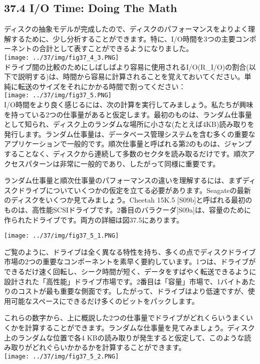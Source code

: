 \hypertarget{io-time-doing-the-math}{%
\subsection*{37.4 I/O Time: Doing The
Math}\label{io-time-doing-the-math}}

ディスクの抽象モデルが完成したので、ディスクのパフォーマンスをよりよく理解するために、少し分析することができます。特に、I/O時間を3つの主要コンポーネントの合計として表すことができるようになりました。\\
\texttt{[image: ../37/img/fig37\_4\_3.PNG]}\\
ドライブ間の比較のためにしばしばより容易に使用されるI/O(R\_I/O)の割合(以下で説明する)は、時間から容易に計算されることを覚えておいてください。単純に転送のサイズをそれにかかる時間で割ってください：\\
\texttt{[image: ../37/img/fig37\_5.PNG]}\\
I/O時間をより良く感じるには、次の計算を実行してみましょう。私たちが興味を持っている2つの仕事量があると仮定します。最初のものは、ランダム仕事量として知られ、ディスク上のランダムな場所に小さな(たとえば4KB)読み取りを発行します。ランダム仕事量は、データベース管理システムを含む多くの重要なアプリケーションで一般的です。順次仕事量と呼ばれる第2のものは、ジャンプすることなく、ディスクから連続して多数のセクタを読み取るだけです。順次アクセスパターンは非常に一般的であり、したがって同様に重要です。

ランダム仕事量と順次仕事量のパフォーマンスの違いを理解するには、まずディスクドライブについていくつかの仮定を立てる必要があります。Seagateの最新のディスクをいくつか見てみましょう。Cheetah
15K.5
{[}S09b{]}と呼ばれる最初のものは、高性能SCSIドライブです。2番目のバラクーダ{[}S09a{]}は、容量のために作られたドライブです。両方の詳細は図37.5にあります。

\texttt{[image: ../37/img/fig37\_5\_1.PNG]}

ご覧のように、ドライブは全く異なる特性を持ち、多くの点でディスクドライブ市場の2つの重要なコンポーネントを素早く要約しています。1つは、ドライブができるだけ速く回転し、シーク時間が短く、データをすばやく転送できるように設計された「高性能」ドライブ市場です。2番目は「容量」市場で、1バイトあたりのコストが最も重要な側面です。したがって、ドライブはより低速ですが、使用可能なスペースにできるだけ多くのビットをパックします。

これらの数字から、上に概説した2つの仕事量でドライブがどれくらいうまくいくかを計算することができます。ランダムな仕事量を見てみましょう。ディスク上のランダムな位置で各4
KBの読み取りが発生すると仮定して、このような読み取りがどれぐらいかかるかを計算することができます。\\
\texttt{[image: ../37/img/fig37\_5\_2.PNG]}

